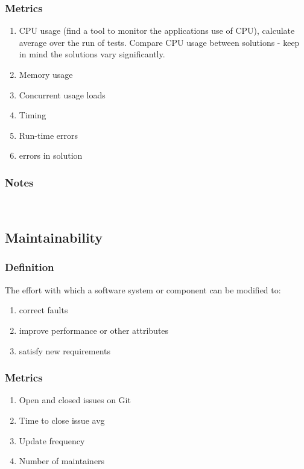 \documentclass{article}
\begin{document}
\subsubsection{Metrics}

\begin{enumerate}
	\item CPU usage (find a tool to monitor the applications use of CPU), calculate average over the run of tests. Compare CPU usage between solutions - keep in mind the solutions vary significantly.
	\item Memory usage
	\item Concurrent usage loads
	\item Timing
	\item Run-time errors
	\item errors in solution
\end{enumerate}

\subsubsection{Notes}

~\newpage

\subsection{Maintainability}
\subsubsection{Definition}
The effort with which a software system or component can be modified to:

\begin{enumerate}
	\item correct faults
	\item improve performance or other
	attributes
	\item satisfy new requirements
\end{enumerate}

\subsubsection{Metrics}
\begin{enumerate}
	\item Open and closed issues on Git
	\item Time to close issue avg
	\item Update frequency
	\item Number of maintainers
\end{enumerate}
\end{document}
